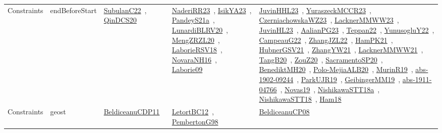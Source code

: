 {\begin{longtable}{lp{3cm}>{\raggedright\arraybackslash}p{6cm}>{\raggedright\arraybackslash}p{6cm}>{\raggedright\arraybackslash}p{8cm}}
Constraints & endBeforeStart & \href{works/SubulanC22.pdf}{SubulanC22}~\cite{SubulanC22}, \href{works/QinDCS20.pdf}{QinDCS20}~\cite{QinDCS20} & \href{works/NaderiRR23.pdf}{NaderiRR23}~\cite{NaderiRR23}, \href{works/IsikYA23.pdf}{IsikYA23}~\cite{IsikYA23}, \href{works/PandeyS21a.pdf}{PandeyS21a}~\cite{PandeyS21a}, \href{works/LunardiBLRV20.pdf}{LunardiBLRV20}~\cite{LunardiBLRV20}, \href{works/MengZRZL20.pdf}{MengZRZL20}~\cite{MengZRZL20}, \href{works/LaborieRSV18.pdf}{LaborieRSV18}~\cite{LaborieRSV18}, \href{works/NovaraNH16.pdf}{NovaraNH16}~\cite{NovaraNH16}, \href{works/Laborie09.pdf}{Laborie09}~\cite{Laborie09} & \href{works/JuvinHHL23.pdf}{JuvinHHL23}~\cite{JuvinHHL23}, \href{works/YuraszeckMCCR23.pdf}{YuraszeckMCCR23}~\cite{YuraszeckMCCR23}, \href{works/CzerniachowskaWZ23.pdf}{CzerniachowskaWZ23}~\cite{CzerniachowskaWZ23}, \href{works/LacknerMMWW23.pdf}{LacknerMMWW23}~\cite{LacknerMMWW23}, \href{works/JuvinHL23.pdf}{JuvinHL23}~\cite{JuvinHL23}, \href{works/AalianPG23.pdf}{AalianPG23}~\cite{AalianPG23}, \href{works/Teppan22.pdf}{Teppan22}~\cite{Teppan22}, \href{works/YunusogluY22.pdf}{YunusogluY22}~\cite{YunusogluY22}, \href{works/CampeauG22.pdf}{CampeauG22}~\cite{CampeauG22}, \href{works/ZhangJZL22.pdf}{ZhangJZL22}~\cite{ZhangJZL22}, \href{works/HamPK21.pdf}{HamPK21}~\cite{HamPK21}, \href{works/HubnerGSV21.pdf}{HubnerGSV21}~\cite{HubnerGSV21}, \href{works/ZhangYW21.pdf}{ZhangYW21}~\cite{ZhangYW21}, \href{works/LacknerMMWW21.pdf}{LacknerMMWW21}~\cite{LacknerMMWW21}, \href{works/TangB20.pdf}{TangB20}~\cite{TangB20}, \href{works/ZouZ20.pdf}{ZouZ20}~\cite{ZouZ20}, \href{works/SacramentoSP20.pdf}{SacramentoSP20}~\cite{SacramentoSP20}, \href{works/BenediktMH20.pdf}{BenediktMH20}~\cite{BenediktMH20}, \href{works/Polo-MejiaALB20.pdf}{Polo-MejiaALB20}~\cite{Polo-MejiaALB20}, \href{works/MurinR19.pdf}{MurinR19}~\cite{MurinR19}, \href{works/abs-1902-09244.pdf}{abs-1902-09244}~\cite{abs-1902-09244}, \href{works/ParkUJR19.pdf}{ParkUJR19}~\cite{ParkUJR19}, \href{works/GeibingerMM19.pdf}{GeibingerMM19}~\cite{GeibingerMM19}, \href{works/abs-1911-04766.pdf}{abs-1911-04766}~\cite{abs-1911-04766}, \href{works/Novas19.pdf}{Novas19}~\cite{Novas19}, \href{works/NishikawaSTT18a.pdf}{NishikawaSTT18a}~\cite{NishikawaSTT18a}, \href{works/NishikawaSTT18.pdf}{NishikawaSTT18}~\cite{NishikawaSTT18}, \href{works/Ham18.pdf}{Ham18}~\cite{Ham18}\\
Constraints & geost & \href{works/BeldiceanuCDP11.pdf}{BeldiceanuCDP11}~\cite{BeldiceanuCDP11} & \href{works/LetortBC12.pdf}{LetortBC12}~\cite{LetortBC12}, \href{works/PembertonG98.pdf}{PembertonG98}~\cite{PembertonG98} & \href{works/BeldiceanuCP08.pdf}{BeldiceanuCP08}~\cite{BeldiceanuCP08}\\

\end{longtable}}
